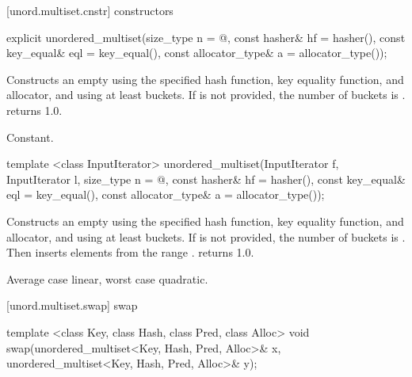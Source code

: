 [unord.multiset.cnstr]{ constructors}

%
\begin{itemdecl}
explicit unordered_multiset(size_type n = @\seebelow@,
                            const hasher& hf = hasher(),
                            const key_equal& eql = key_equal(),
                            const allocator_type& a = allocator_type());
\end{itemdecl}

\begin{itemdescr}
\pnum
\effects Constructs an empty  using the
specified hash function, key equality function, and allocator, and
using at least \textit{} buckets.  If \textit{} is not
provided, the number of buckets is .
 returns 1.0.

\pnum
\complexity Constant.
\end{itemdescr}

%
\begin{itemdecl}
template <class InputIterator>
  unordered_multiset(InputIterator f, InputIterator l,
                     size_type n = @\seebelow@,
                     const hasher& hf = hasher(),
                     const key_equal& eql = key_equal(),
                     const allocator_type& a = allocator_type());
\end{itemdecl}

\begin{itemdescr}
\pnum\effects
Constructs an empty  using the
specified hash function, key equality function, and allocator, and
using at least \textit{} buckets. If \textit{} is not
provided, the number of buckets is . Then
inserts elements from the range \tcode{[\textit{f}, \textit{l})}.
 returns 1.0.

\pnum\complexity Average case linear, worst case quadratic.
\end{itemdescr}

[unord.multiset.swap]{ swap}

%
%
\begin{itemdecl}
template <class Key, class Hash, class Pred, class Alloc>
  void swap(unordered_multiset<Key, Hash, Pred, Alloc>& x,
            unordered_multiset<Key, Hash, Pred, Alloc>& y);
\end{itemdecl}

